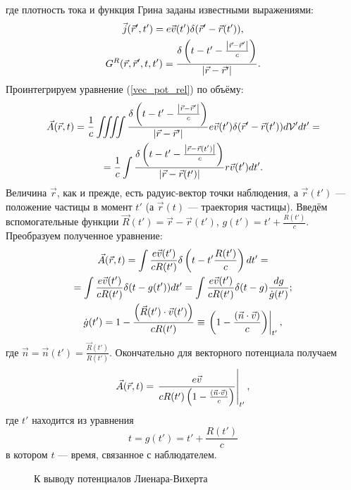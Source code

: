     где плотность тока и функция Грина заданы известными выражениями:
    \begin{gather*}
        \vec{j}(\vec{r}', t') = e\vec{v}(t')\delta(\vec{r}' - \vec{r}(t')),\\
        G^R(\vec{r}, \vec{r}', t, t') = \frac{\delta\left({t - t' - \frac{\left|{\vec{r} - \vec{r}'}\right|}{c}}\right)}{\left|{\vec{r} - \vec{r}'}\right|}.
    \end{gather*}
    Проинтегрируем уравнение (\ref{vec_pot_rel}) по объёму:
    \begin{gather*}
        \vec{A}(\vec{r}, t) = \frac 1c \iiiint \frac{\delta\left({t - t' - \frac{\left|{\vec{r} - \vec{r}'}\right|}{c}}\right)}{\left|{\vec{r} - \vec{r}'}\right|}
        e\vec{v}(t')\delta(\vec{r}' - \vec{r}(t')) d\mathcal{V}'dt' = \\ =
        \frac 1c \int \frac{\delta\left({t - t' - \frac{\left|{\vec{r} - \vec{r}(t')}\right|}{c}}\right)}{\left|{\vec{r} - \vec{r}(t')}\right|} r\vec{v}(t')dt'.
    \end{gather*}
    Величина $\vec{r}$, как и прежде, есть радуис-вектор точки наблюдения, а $\vec{r}(t')$ --- положение частицы в момент $t'$ (а $\vec{r}(t)$ --- траектория частицы).
    Введём вспомогательные функции $\vec{R}(t') = \vec{r} - \vec{r}(t')$, $g(t') = t' + \frac{R(t')}{c}$. Преобразуем полученное уравнение:
    \begin{gather*}
        \vec{A}(\vec{r}, t) = \int \frac{e \vec{v}(t')}{cR(t')} \delta\left({t - t' \frac{R(t')}{c}}\right) dt'= \\ =
        \int \frac{e\vec{v}(t')}{cR(t')}\delta(t - g(t')) dt' = \int \frac{e\vec{v}(t')}{cR(t')}\delta(t - g)\frac{dg}{\dot{g}(t')}; \\
        \dot{g}(t') = 1 - \frac{\left({\vec R(t')\cdot\vec v(t')}\right)}{cR(t')} \equiv \left. \left({1 - \frac{\left({\vec{n}\cdot\vec{v}}\right)}{c}}\right) \right|_{t'},
    \end{gather*}
    где $\vec{n} = \vec{n}(t') = \frac{\vec{R}(t')}{R(t')}$. Окончательно для векторного потенциала получаем
    \begin{equation}
        \vec{A}(\vec{r}, t) = \left. \frac{e\vec{v}}{cR(t') \left({1 - \frac{\left({\vec{n}\cdot\vec{v}}\right)}{c}}\right)} \right|_{t'}, \label{LV_A}
    \end{equation}
    где $t'$ находится из уравнения
    \begin{equation}
        t = g(t') = t' + \frac{R(t')}{c} \label{rel_abs_time}
    \end{equation}
    в котором $t$ --- время, связанное с наблюдателем. 
    \begin{figure}[t]
        \centering{
            
        }
        \caption{К выводу потенциалов Лиенара-Вихерта}
    \end{figure}
